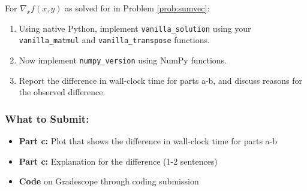 \documentclass{article}
\begin{document}
\begin{aprob} \label{prob:sumvecimp}
    For $\nabla_x f(x,y)$ as solved for in Problem \ref{prob:sumvec}:
    \begin{enumerate}
        \item {} \sloppy Using native Python, implement \verb|vanilla_solution| using your \verb|vanilla_matmul| and \verb|vanilla_transpose| functions.
        \item {} Now implement \verb|numpy_version| using NumPy functions.
        \item {} Report the difference in wall-clock time for parts a-b, and discuss reasons for the observed difference.
    \end{enumerate}
    
    \subsubsection*{What to Submit:}
    \begin{itemize}
        \item \textbf{Part c:} Plot that shows the difference in wall-clock time for parts a-b
        \item \textbf{Part c:} Explanation for the difference (1-2 sentences)
        \item \textbf{Code} on Gradescope through coding submission
    \end{itemize}
\end{aprob}
\end{document}

